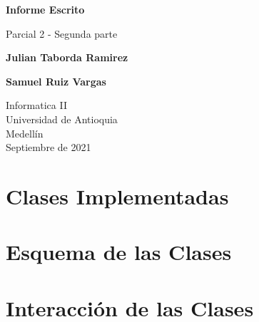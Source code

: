 \documentclass{article}
\begin{document}
\begin{titlepage}
    \begin{center}
        \vspace*{1cm}
            
        \Huge
        \textbf{Informe Escrito}
            
        \vspace{0.5cm}
        \LARGE
        Parcial 2 - Segunda parte
            
        \vspace{1.5cm}
            
        \textbf{Julian Taborda Ramirez}
        
        \vspace{0.5cm}
        
        \textbf{Samuel Ruiz Vargas}
            
        \vfill
            
        \vspace{0.8cm}
            
        \Large
        Informatica II\\
        Universidad de Antioquia\\
        Medellín\\
        Septiembre de 2021
            
    \end{center}
\end{titlepage}

\tableofcontents
\vspace*{1.2cm}

\newpage

\section{Clases Implementadas}
\label{clases}

    \begin{flushleft}

    \end{flushleft}

    
\section{Esquema de las Clases}
\label{esquema}
    \begin{flushleft}

    \end{flushleft}
        
    
\section{Interacción de las Clases}
\label{interacciones}
    \begin{flushleft}
    
    \end{flushleft}
    
\end{document}
